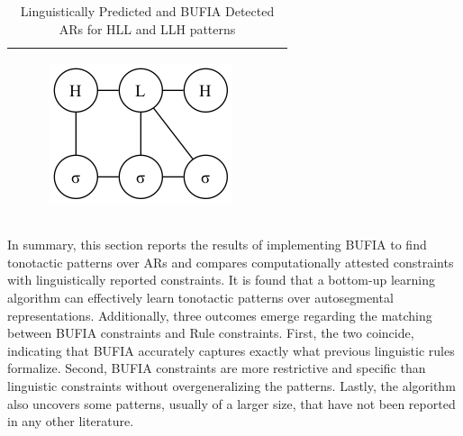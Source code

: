 \documentclass[11pt,letterpaper]{article}
\begin{document}
\begin{table}[ht]
\begin{tabular}{c|c}
\begin{subfigure}{0.19\textwidth}
		\includegraphics[width=\textwidth]{hausacons/3HLHt3s3}
		\caption{}
		\label{bufiaHLLH}
		\end{subfigure} 	\\	
 		\hline
	\end{tabular}
	\caption{Linguistically Predicted and BUFIA Detected ARs for HLL and LLH patterns}
	\label{tab:llh}
\end{table}



In summary, this section reports the results of implementing BUFIA to find tonotactic patterns over ARs and compares computationally attested constraints with linguistically reported constraints. It is found that a bottom-up learning algorithm can effectively learn tonotactic patterns over autosegmental representations. Additionally, three outcomes emerge regarding the matching between BUFIA constraints and Rule constraints. First, the two coincide, indicating that BUFIA accurately captures exactly what previous linguistic rules formalize. Second, BUFIA constraints are more restrictive and specific than linguistic constraints without overgeneralizing the patterns. Lastly, the algorithm also uncovers some patterns, usually of a larger size, that have not been reported in any other literature.
\end{document}
